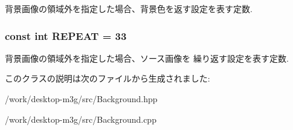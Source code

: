 背景画像の領域外を指定した場合、背景色を返す設定を表す定数. \hypertarget{classm3g_1_1Background_a466d02b3d88f856854d0a0955be32e8}{
\subsubsection[{REPEAT}]{\setlength{\rightskip}{0pt plus 5cm}const int {\bf REPEAT} = 33}}
\label{classm3g_1_1Background_a466d02b3d88f856854d0a0955be32e8}


背景画像の領域外を指定した場合、ソース画像を 繰り返す設定を表す定数. 

このクラスの説明は次のファイルから生成されました:\begin{CompactItemize}
\item 
/work/desktop-m3g/src/Background.hpp\item 
/work/desktop-m3g/src/Background.cpp\end{CompactItemize}
